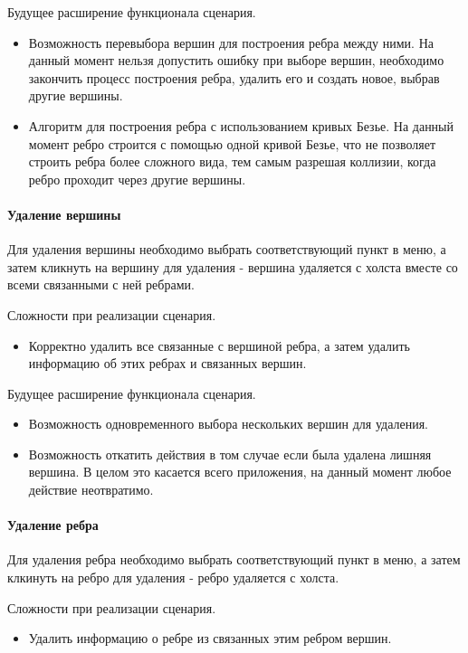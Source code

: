 Будущее расширение функционала сценария.
\begin{itemize}
	\item Возможность перевыбора вершин для построения ребра между ними. На данный момент нельзя допустить ошибку при выборе вершин, необходимо закончить процесс построения ребра, удалить его и создать новое, выбрав другие вершины.
	\item Алгоритм для построения ребра с использованием кривых Безье. На данный момент ребро строится с помощью одной кривой Безье, что не позволяет строить ребра более сложного вида, тем самым разрешая коллизии, когда ребро проходит через другие вершины.
\end{itemize}

\paragraph{Удаление вершины}

Для удаления вершины необходимо выбрать соответствующий пункт в меню, а затем кликнуть на вершину для удаления - вершина удаляется с холста вместе со всеми связанными с ней ребрами.

Сложности при реализации сценария.
\begin{itemize}
	\item Корректно удалить все связанные с вершиной ребра, а затем удалить информацию об этих ребрах и связанных вершин.
\end{itemize}

Будущее расширение функционала сценария.
\begin{itemize}
	\item Возможность одновременного выбора нескольких вершин для удаления.
	\item Возможность откатить действия в том случае если была удалена лишняя вершина. В целом это касается всего приложения, на данный момент любое действие неотвратимо.
\end{itemize}

\paragraph{Удаление ребра}

Для удаления ребра необходимо выбрать соответствующий пункт в меню, а затем клкинуть на ребро для удаления - ребро удаляется с холста.

Сложности при реализации сценария.
\begin{itemize}
	\item Удалить информацию о ребре из связанных этим ребром вершин.
\end{itemize}

